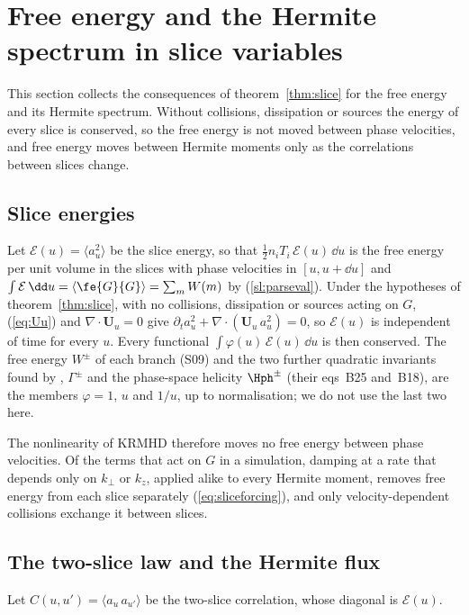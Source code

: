 \section{Free energy and the Hermite spectrum in slice variables}\label{sec:hermite}

This section collects the consequences of theorem~\ref{thm:slice} for the free energy and its Hermite spectrum. Without collisions, dissipation or sources the energy of every slice is conserved, so the free energy is not moved between phase velocities, and free energy moves between Hermite moments only as the correlations between slices change.

\subsection{Slice energies}\label{hm:energy}

Let $\mathcal E(u)=\langle a_u^2\rangle$ be the slice energy, so that $\tfrac12n_iT_i\,\mathcal E(u)\,\dd u$ is the free energy per unit volume in the slices with phase velocities in $[u,u+\dd u]$ and $\int\mathcal E\,\dd u=\langle\fe{G}{G}\rangle=\sum_mW(m)$ by (\ref{sl:parseval}). Under the hypotheses of theorem~\ref{thm:slice}, with no collisions, dissipation or sources acting on $G$, (\ref{eq:Uu}) and $\nabla\cdot\boldsymbol U_u=0$ give $\partial_ta_u^2+\nabla\cdot(\boldsymbol U_u\,a_u^2)=0$, so $\mathcal E(u)$ is independent of time for every $u$. Every functional $\int\varphi(u)\,\mathcal E(u)\,\dd u$ is then conserved. The free energy $W^\pm$ of each branch (S09) and the two further quadratic invariants found by \citet{Chandran2026}, $\Gamma^\pm$ and the phase-space helicity $\Hph^\pm$ (their eqs~B25 and~B18), are the members $\varphi=1$, $u$ and $1/u$, up to normalisation; we do not use the last two here.

The nonlinearity of KRMHD therefore moves no free energy between phase velocities. Of the terms that act on $G$ in a simulation, damping at a rate that depends only on $k_\perp$ or $k_z$, applied alike to every Hermite moment, removes free energy from each slice separately (\ref{eq:sliceforcing}), and only velocity-dependent collisions exchange it between slices.

\subsection{The two-slice law and the Hermite flux}\label{hm:flux}

Let $C(u,u')=\langle a_u\,a_{u'}\rangle$ be the two-slice correlation, whose diagonal is $\mathcal E(u)$.

